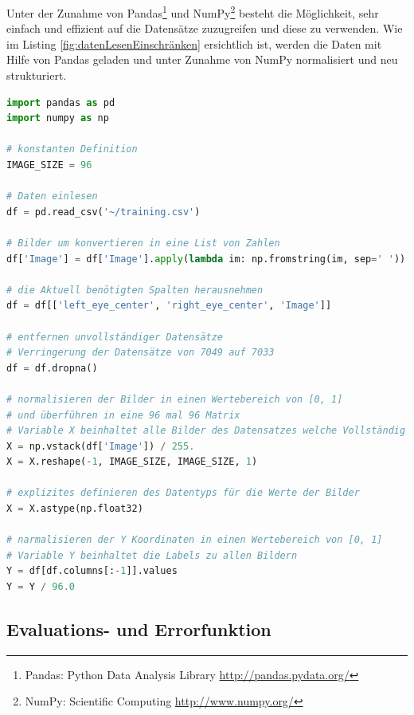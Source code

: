 \noindent
Unter der Zunahme von Pandas\footnote{Pandas: Python Data Analysis Library \url{http://pandas.pydata.org/}} und NumPy\footnote{NumPy: Scientific Computing \url{http://www.numpy.org/}} besteht die Möglichkeit, sehr einfach und effizient auf die Datensätze zuzugreifen und diese zu verwenden. 
Wie im Listing \ref{fig:datenLesenEinschränken} ersichtlich ist, werden die Daten mit Hilfe von Pandas geladen und unter Zunahme von NumPy normalisiert und neu strukturiert. 
\begin{lstlisting}[caption={Daten einlesen und einschränken},label=fig:datenLesenEinschränken,captionpos=b,language=Python]
import pandas as pd
import numpy as np

# konstanten Definition
IMAGE_SIZE = 96

# Daten einlesen
df = pd.read_csv('~/training.csv')

# Bilder um konvertieren in eine List von Zahlen
df['Image'] = df['Image'].apply(lambda im: np.fromstring(im, sep=' '))

# die Aktuell benötigten Spalten herausnehmen
df = df[['left_eye_center', 'right_eye_center', 'Image']]

# entfernen unvollständiger Datensätze
# Verringerung der Datensätze von 7049 auf 7033
df = df.dropna()

# normalisieren der Bilder in einen Wertebereich von [0, 1] 
# und überführen in eine 96 mal 96 Matrix
# Variable X beinhaltet alle Bilder des Datensatzes welche Vollständig sind
X = np.vstack(df['Image']) / 255.
X = X.reshape(-1, IMAGE_SIZE, IMAGE_SIZE, 1)

# explizites definieren des Datentyps für die Werte der Bilder
X = X.astype(np.float32)

# narmalisieren der Y Koordinaten in einen Wertebereich von [0, 1]
# Variable Y beinhaltet die Labels zu allen Bildern
Y = df[df.columns[:-1]].values
Y = Y / 96.0
\end{lstlisting}

\subsection{Evaluations- und Errorfunktion}

